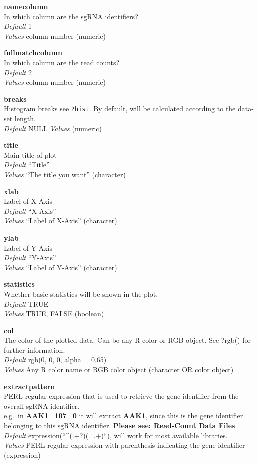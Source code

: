 \documentclass[]{article}
\begin{document}
\textbf{namecolumn}\\
In which column are the sgRNA identifiers?\\
\emph{Default} 1\\
\emph{Values} column number (numeric)

\textbf{fullmatchcolumn}\\
In which column are the read counts?\\
\emph{Default} 2\\
\emph{Values} column number (numeric)

\textbf{breaks}\\
Histogram breaks see \texttt{?hist}. By default, will be calculated
according to the data-set length.\\
\emph{Default} NULL \emph{Values} (numeric)

\textbf{title}\\
Main title of plot\\
\emph{Default} ``Title''\\
\emph{Values} ``The title you want'' (character)

\textbf{xlab}\\
Label of X-Axis\\
\emph{Default} ``X-Axis''\\
\emph{Values} ``Label of X-Axis'' (character)

\textbf{ylab}\\
Label of Y-Axis\\
\emph{Default} ``Y-Axis''\\
\emph{Values} ``Label of Y-Axis'' (character)

\textbf{statistics}\\
Whether basic statistics will be shown in the plot.\\
\emph{Default} TRUE\\
\emph{Values} TRUE, FALSE (boolean)

\textbf{col}\\
The color of the plotted data. Can be any R color or RGB object. See
?rgb() for further information.\\
\emph{Default} rgb(0, 0, 0, alpha = 0.65)\\
\emph{Values} Any R color name or RGB color object (character OR color
object)

\textbf{extractpattern}\\
PERL regular expression that is used to retrieve the gene identifier
from the overall sgRNA identifier.\\
e.g.~in \textbf{AAK1\_107\_0} it will extract \textbf{AAK1}, since this
is the gene identifier belonging to this sgRNA identifier.
\textbf{Please see: Read-Count Data Files}\\
\emph{Default} expression(``\^{}(.+?)(\_.+)``), will work for most
available libraries.\\
\emph{Values} PERL regular expression with parenthesis indicating the
gene identifier (expression)
\end{document}
